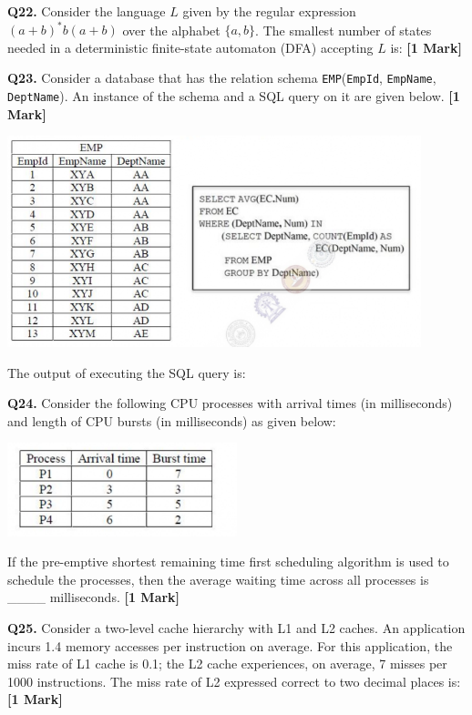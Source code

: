 \documentclass[11pt]{article}
\newcommand{\questiona}[2]{
    \noindent\textbf{Q#2.} #1 \hfill \textbf{[1 Mark]}
}
\begin{document}
\vspace{0.5cm}

\questiona{Consider the language \( L \) given by the regular expression \( (a + b)^* b (a + b) \) over the alphabet \( \{a, b\} \).  
The smallest number of states needed in a deterministic finite-state automaton (DFA) accepting \( L \) is:}{22}

\vspace{0.5cm}

\questiona{Consider a database that has the relation schema \texttt{EMP}(\texttt{EmpId}, \texttt{EmpName}, \texttt{DeptName}).  
An instance of the schema and a SQL query on it are given below.}{23}
\begin{center}
\includegraphics[width=0.9\textwidth]{figures/23.png}
\end{center}
The output of executing the SQL query is:

\vspace{0.5cm}

\questiona{Consider the following CPU processes with arrival times (in milliseconds) and length of CPU bursts (in milliseconds) as given below:  
\begin{center}
\includegraphics[width=0.5\textwidth]{figures/24.png}
\end{center}
If the pre-emptive shortest remaining time first scheduling algorithm is used to schedule the processes, then the average waiting time across all processes is \_\_\_\_ milliseconds.}{24}
\vspace{0.5cm}

\questiona{Consider a two-level cache hierarchy with L1 and L2 caches.  
An application incurs 1.4 memory accesses per instruction on average. For this application, the miss rate of L1 cache is 0.1;  
the L2 cache experiences, on average, 7 misses per 1000 instructions. The miss rate of L2 expressed correct to two decimal places is:}{25}
\vspace{0.5cm}
\end{document}
